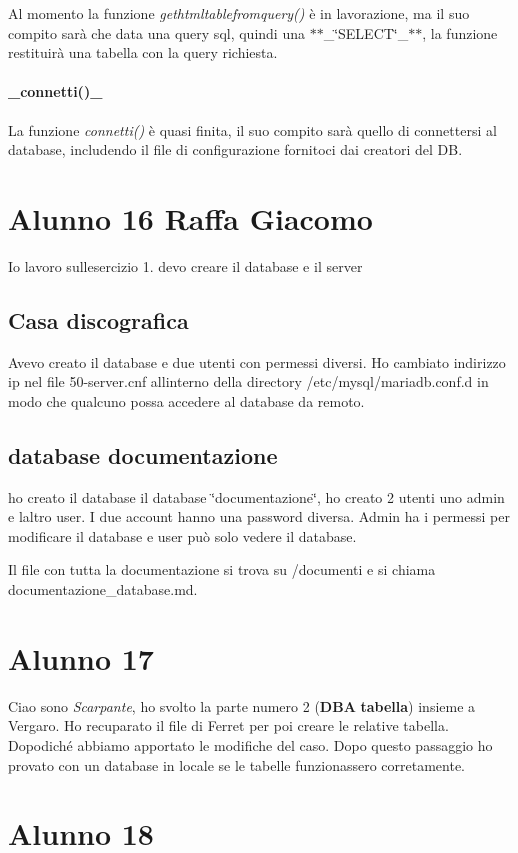 Al momento la funzione {\itshape gethtmltablefromquery()} è in lavorazione, ma il suo compito sarà che data una query sql, quindi una $\ast$$\ast$\+\_\+\char`\"{}\+S\+E\+L\+E\+C\+T\char`\"{}\+\_\+$\ast$$\ast$, la funzione restituirà una tabella con la query richiesta. \paragraph*{\+\_\+connetti()\+\_\+}

La funzione {\itshape connetti()} è quasi finita, il suo compito sarà quello di connettersi al database, includendo il file di configurazione fornitoci dai creatori del DB.

\section*{Alunno 16 Raffa Giacomo}

Io lavoro sull\textquotesingle{}esercizio 1. devo creare il database e il server \subsection*{Casa discografica}

Avevo creato il database e due utenti con permessi diversi. Ho cambiato indirizzo ip nel file 50-\/server.\+cnf all\textquotesingle{}interno della directory /etc/mysql/mariadb.conf.\+d in modo che qualcuno possa accedere al database da remoto. \subsection*{database documentazione}

ho creato il database il database \char`\"{}documentazione\char`\"{}, ho creato 2 utenti uno \textquotesingle{}admin\textquotesingle{} e l\textquotesingle{}altro \textquotesingle{}user\textquotesingle{}. I due account hanno una password diversa. Admin ha i permessi per modificare il database e user può solo vedere il database.

Il file con tutta la documentazione si trova su /documenti e si chiama documentazione\+\_\+database.\+md.

\section*{Alunno 17}

Ciao sono {\itshape Scarpante}, ho svolto la parte numero 2 ({\bfseries{D\+BA}} {\bfseries{tabella}}) insieme a Vergaro. Ho recuparato il file di Ferret per poi creare le relative tabella. Dopodiché abbiamo apportato le modifiche del caso. Dopo questo passaggio ho provato con un database in locale se le tabelle funzionassero corretamente. \section*{Alunno 18}


